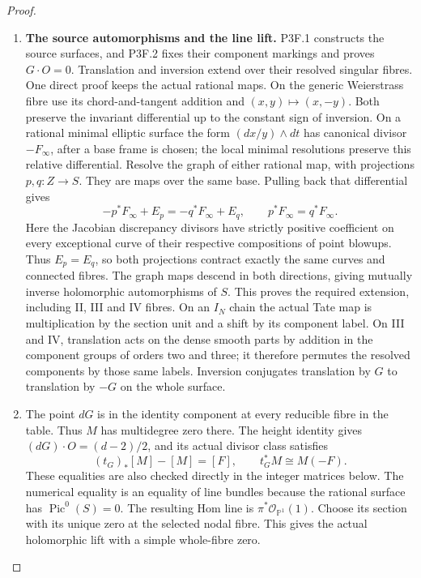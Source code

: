 \begin{proof}
\begin{enumerate}[label=\arabic*.]
\item \par\medskip\noindent\textbf{The source automorphisms and the line lift.}\enspace
P3F.1 constructs the source surfaces, and P3F.2 fixes their component
markings and proves \(G\cdot O=0\).  Translation and inversion
extend over their resolved singular fibres.  One direct proof keeps
the actual rational maps.  On the generic Weierstrass fibre use its
chord-and-tangent addition and \((x,y)\mapsto(x,-y)\).  Both preserve
the invariant differential up to the constant sign of inversion.
On a rational minimal elliptic surface the form
\((dx/y)\wedge dt\) has canonical divisor \(-F_\infty\), after a
base frame is chosen; the local minimal resolutions preserve this
relative differential.  Resolve the graph of either rational map,
with projections \(p,q:Z\to S\).  They are maps over the same base.
Pulling back that differential gives
\[
 -p^*F_\infty+E_p=-q^*F_\infty+E_q,
 \qquad p^*F_\infty=q^*F_\infty.
\]
Here the Jacobian discrepancy divisors have strictly positive
coefficient on every exceptional curve of their respective
compositions of point blowups.  Thus \(E_p=E_q\), so both
projections contract exactly the same curves and connected fibres.
The graph maps descend in both directions, giving mutually inverse
holomorphic automorphisms of \(S\).  This proves the required
extension, including II, III and IV fibres.  On an \(I_N\) chain
the actual Tate map is multiplication by the section unit and a
shift by its component label.  On III and IV, translation acts on
the dense smooth parts by addition in the component groups of
orders two and three; it therefore permutes the resolved components
by those same labels.  Inversion conjugates translation by \(G\)
to translation by \(-G\) on the whole surface.

\item The point \(dG\) is in the identity component at every reducible
fibre in the table.  Thus \(M\) has multidegree zero there.
The height identity gives
\((dG)\cdot O=(d-2)/2\), and its actual divisor class satisfies
\[
 (t_G)_*[M]-[M]=[F],\qquad t_G^*M\cong M(-F).           \tag{P3K.22.2}
\]
These equalities are also checked directly in the integer matrices
below.  The numerical equality is an equality of line bundles
because the rational surface has \(\operatorname{Pic}^0(S)=0\).
The resulting Hom line is \(\pi^*\mathcal O_{\mathbb P^1}(1)\).
Choose its section with its unique zero at the selected nodal fibre.
This gives the actual holomorphic lift with a simple whole-fibre
zero.


\end{enumerate}
\end{proof}

